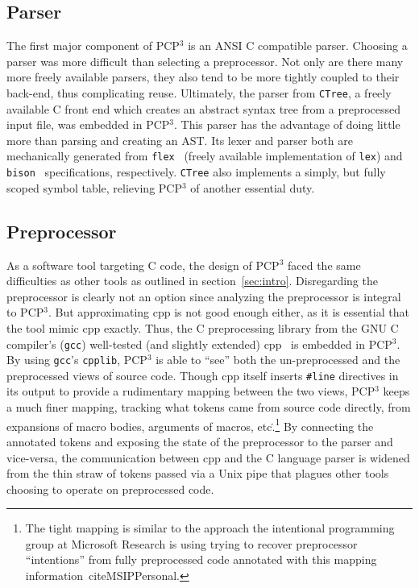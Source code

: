 \documentclass{article}
\newcommand{\pcp}{\mbox{\textsf{PCP}$^3$}}
\newcommand{\Cpp}{\mbox{\textsf{cpp}}}
\newcommand{\C}{\mbox{\textsf{C}}}
\newcommand{\ppd}[1]{\texttt{\##1}}
\newcommand{\etc}{etc\.}
\begin{document}
\subsection{Parser}

The first major component of \pcp{} is an ANSI \C{} compatible parser.
Choosing a parser was more difficult than selecting a preprocessor. Not
only are there many more freely available parsers, they also tend to be
more tightly coupled to their back-end, thus complicating reuse.
Ultimately, the parser from \texttt{CTree}, a freely available \C{}
front end which creates an abstract syntax tree from a preprocessed
input file, was embedded in \pcp{}.  This parser has the advantage of
doing little more than parsing and creating an AST.  Its lexer and
parser both are mechanically generated from \texttt{flex}~\cite{Flex}
(freely available implementation of \texttt{lex}) and
\texttt{bison}~\cite{Bison} specifications, respectively.
\texttt{CTree} also implements a simply, but fully scoped symbol table,
relieving \pcp{} of another essential duty.

\subsection{Preprocessor}

As a software tool targeting \C{} code, the design of \pcp{} faced the
same difficulties as other tools as outlined in section~\ref{sec:intro}.
Disregarding the preprocessor is clearly not an option since analyzing
the preprocessor is integral to \pcp{}.  But approximating \Cpp{} is not
good enough either, as it is essential that the tool mimic \Cpp{}
exactly. Thus, the \C{} preprocessing library from the GNU \C{}
compiler's (\texttt{gcc}) well-tested (and slightly extended)
\Cpp{}~\cite{GCC} is embedded in \pcp{}.  By using \texttt{gcc}'s
\texttt{cpplib}, \pcp{} is able to ``see'' both the un-preprocessed and
the preprocessed views of source code.  Though \Cpp{} itself inserts
\ppd{line} directives in its output to provide a rudimentary mapping
between the two views, \pcp{} keeps a much finer mapping, tracking
what tokens came from source code directly, from expansions of macro
bodies, arguments of macros, \etc.\footnote{The tight mapping is similar
  to the approach the intentional programming group at Microsoft
  Research is using trying to recover preprocessor ``intentions'' from
  fully preprocessed code annotated with this mapping
  information~cite{MSIPPersonal}.}  By connecting the annotated tokens
and exposing the state of the preprocessor to the parser and vice-versa,
the communication between \Cpp{} and the \C{} language parser is widened
from the thin straw of tokens passed via a Unix pipe that plagues other
tools choosing to operate on preprocessed code.
\end{document}
